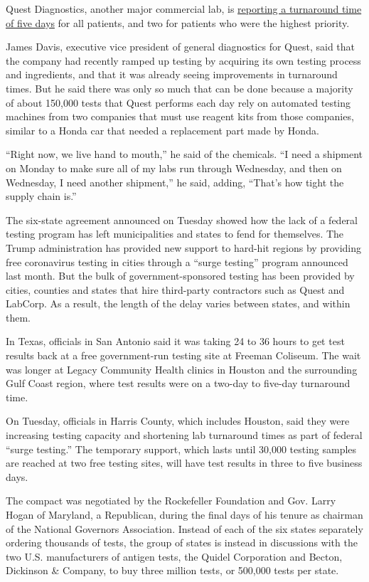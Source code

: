 Quest Diagnostics, another major commercial lab, is
\href{https://newsroom.questdiagnostics.com/COVIDTestingUpdates/}{reporting
a turnaround time of five days} for all patients, and two for patients
who were the highest priority.

James Davis, executive vice president of general diagnostics for Quest,
said that the company had recently ramped up testing by acquiring its
own testing process and ingredients, and that it was already seeing
improvements in turnaround times. But he said there was only so much
that can be done because a majority of about 150,000 tests that Quest
performs each day rely on automated testing machines from two companies
that must use reagent kits from those companies, similar to a Honda car
that needed a replacement part made by Honda.

``Right now, we live hand to mouth,'' he said of the chemicals. ``I need
a shipment on Monday to make sure all of my labs run through Wednesday,
and then on Wednesday, I need another shipment,'' he said, adding,
``That's how tight the supply chain is.''

The six-state agreement announced on Tuesday showed how the lack of a
federal testing program has left municipalities and states to fend for
themselves. The Trump administration has provided new support to
hard-hit regions by providing free coronavirus testing in cities through
a ``surge testing'' program announced last month. But the bulk of
government-sponsored testing has been provided by cities, counties and
states that hire third-party contractors such as Quest and LabCorp. As a
result, the length of the delay varies between states, and within them.

In Texas, officials in San Antonio said it was taking 24 to 36 hours to
get test results back at a free government-run testing site at Freeman
Coliseum. The wait was longer at Legacy Community Health clinics in
Houston and the surrounding Gulf Coast region, where test results were
on a two-day to five-day turnaround time.

On Tuesday, officials in Harris County, which includes Houston, said
they were increasing testing capacity and shortening lab turnaround
times as part of federal ``surge testing.'' The temporary support, which
lasts until 30,000 testing samples are reached at two free testing
sites, will have test results in three to five business days.

The compact was negotiated by the Rockefeller Foundation and Gov. Larry
Hogan of Maryland, a Republican, during the final days of his tenure as
chairman of the National Governors Association. Instead of each of the
six states separately ordering thousands of tests, the group of states
is instead in discussions with the two U.S. manufacturers of antigen
tests, the Quidel Corporation and Becton, Dickinson \& Company, to buy
three million tests, or 500,000 tests per state.

